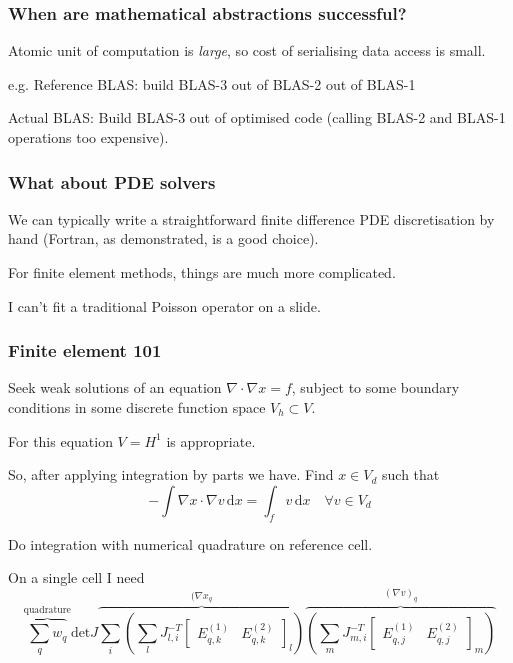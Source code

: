 \documentclass[presentation]{beamer}
\begin{document}
\begin{frame}
  \frametitle{When are mathematical abstractions successful?}

  Atomic unit of computation is \emph{large}, so cost of serialising
  data access is small.

  e.g. Reference BLAS: build BLAS-3 out of BLAS-2 out of BLAS-1

  Actual BLAS: Build BLAS-3 out of optimised code (calling BLAS-2 and
  BLAS-1 operations too expensive).
\end{frame}

\begin{frame}
  \frametitle{What about PDE solvers}

  We can typically write a straightforward finite difference PDE
  discretisation by hand (Fortran, as demonstrated, is a good choice).

  For finite element methods, things are much more complicated.

  I can't fit a traditional Poisson operator on a slide.
\end{frame}

\begin{frame}[allowframebreaks]
  \frametitle{Finite element 101}
  Seek weak solutions of an equation $\nabla \cdot \nabla x = f$,
  subject to some boundary conditions in some discrete function space
  $V_h \subset V$.

  For this equation $V = H^1$ is appropriate.

  So, after applying integration by parts we have.  Find $x\in V_d$
  such that
  \begin{equation}
    \label{eq:1}
    -\int \nabla x \cdot \nabla v\,\text{d}x = \int_fv\,\text{d}x
    \quad \forall v \in V_d
  \end{equation}

  Do integration with numerical quadrature on reference cell.

  \pagebreak
  On a single cell I need
  \begin{equation}
  \label{eq:gem}
  \overbrace{\sum_q w_q}^{\text{quadrature}} \text{det}J
  \overbrace{\sum_{i} \left( \sum_{l}
    J^{-T}_{l,i} \begin{bmatrix}
      E^{(1)}_{q,k} & E^{(2)}_{q,k}
    \end{bmatrix}_{l} \right)}^{(\nabla x_q}
  \overbrace{\left( \sum_{m} J^{-T}_{m,i} \begin{bmatrix}
      E^{(1)}_{q,j} & E^{(2)}_{q,j}
    \end{bmatrix}_{m} \right)}^{(\nabla v)_q}
\end{equation}
\end{frame}
\end{document}
